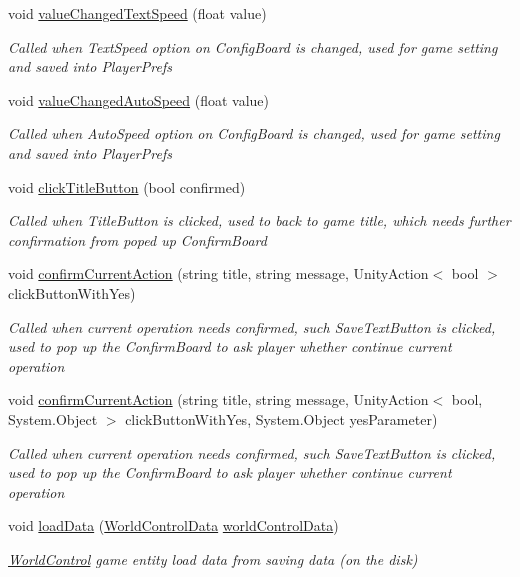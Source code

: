 \begin{DoxyCompactItemize}
void \hyperlink{class_world_control_adad02d5d0484bd4204d6e0e39253dca8}{value\+Changed\+Text\+Speed} (float value)
\begin{DoxyCompactList}\small\item\em Called when Text\+Speed option on Config\+Board is changed, used for game setting and saved into Player\+Prefs \end{DoxyCompactList}\item 
void \hyperlink{class_world_control_a71972fc10c5a2734a9a8c10849c60faf}{value\+Changed\+Auto\+Speed} (float value)
\begin{DoxyCompactList}\small\item\em Called when Auto\+Speed option on Config\+Board is changed, used for game setting and saved into Player\+Prefs \end{DoxyCompactList}\item 
void \hyperlink{class_world_control_a99c9c36c15d02586510c73bad7b35fe3}{click\+Title\+Button} (bool confirmed)
\begin{DoxyCompactList}\small\item\em Called when Title\+Button is clicked, used to back to game title, which needs further confirmation from poped up Confirm\+Board \end{DoxyCompactList}\item 
void \hyperlink{class_world_control_ae37c3979deafb06e06db4e37e3a89874}{confirm\+Current\+Action} (string title, string message, Unity\+Action$<$ bool $>$ click\+Button\+With\+Yes)
\begin{DoxyCompactList}\small\item\em Called when current operation needs confirmed, such Save\+Text\+Button is clicked, used to pop up the Confirm\+Board to ask player whether continue current operation \end{DoxyCompactList}\item 
void \hyperlink{class_world_control_a701a10f2ca9662f666c0e6bef6cc7d60}{confirm\+Current\+Action} (string title, string message, Unity\+Action$<$ bool, System.\+Object $>$ click\+Button\+With\+Yes, System.\+Object yes\+Parameter)
\begin{DoxyCompactList}\small\item\em Called when current operation needs confirmed, such Save\+Text\+Button is clicked, used to pop up the Confirm\+Board to ask player whether continue current operation \end{DoxyCompactList}\item 
void \hyperlink{class_world_control_a4b2c1ba84e78978ea05fb09b862f9df5}{load\+Data} (\hyperlink{class_world_control_data}{World\+Control\+Data} \hyperlink{class_world_control_a61aa6f540da8869b1b1dc8af6adead26}{world\+Control\+Data})
\begin{DoxyCompactList}\small\item\em \hyperlink{class_world_control}{World\+Control} game entity load data from saving data (on the disk) \end{DoxyCompactList}\end{DoxyCompactItemize}
